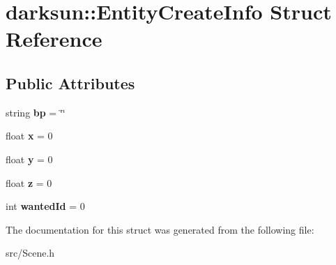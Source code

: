 \hypertarget{structdarksun_1_1_entity_create_info}{}\section{darksun\+::Entity\+Create\+Info Struct Reference}
\label{structdarksun_1_1_entity_create_info}
\subsection*{Public Attributes}
\begin{DoxyCompactItemize}
\item 
\mbox{\label{structdarksun_1_1_entity_create_info_ac789cf844cdcb064657249379f856a60}} 
string {\bfseries bp} = \char`\"{}\char`\"{}
\item 
\mbox{\label{structdarksun_1_1_entity_create_info_adad49f10d8380526813e70d513c7f234}} 
float {\bfseries x} = 0
\item 
\mbox{\label{structdarksun_1_1_entity_create_info_a266a22f0f3fe134e665dacfe4a444ef7}} 
float {\bfseries y} = 0
\item 
\mbox{\label{structdarksun_1_1_entity_create_info_a94296a6832541c558ffa4ca7cc10fd1a}} 
float {\bfseries z} = 0
\item 
\mbox{\label{structdarksun_1_1_entity_create_info_aca62fdb9c9f14df2c78ae6df8ecb9af6}} 
int {\bfseries wanted\+Id} = 0
\end{DoxyCompactItemize}


The documentation for this struct was generated from the following file\+:\begin{DoxyCompactItemize}
\item 
src/Scene.\+h\end{DoxyCompactItemize}
